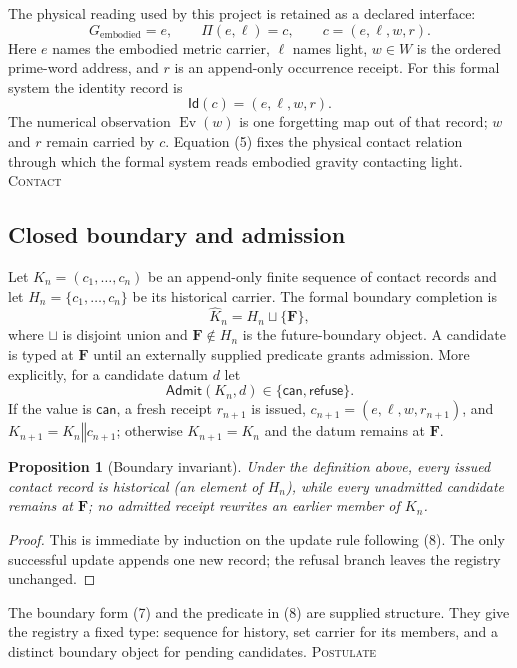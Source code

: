 \documentclass[10pt]{article}
\newtheorem{proposition}[definition]{Proposition}
\theoremstyle{remark}
\newcommand{\Ev}{\operatorname{Ev}}
\newcommand{\Admit}{\mathsf{Admit}}
\newcommand{\Id}{\mathsf{Id}}
\newcommand{\cstatus}[1]{\hfill\textsc{#1}}
\newcommand{\postulate}{\textsc{Postulate}}
\newcommand{\interface}{\textsc{Contact}}
\begin{document}
The physical reading used by this project is retained as a declared interface:
\[
 G_{\mathrm{embodied}}=e,\qquad
 \Pi(e,\ell)=c,\qquad
 c=(e,\ell,w,r).
\tag{5}
\]
Here $e$ names the embodied metric carrier, $\ell$ names light, $w\in W$ is
the ordered prime-word address, and $r$ is an append-only occurrence receipt.
For this formal system the identity record is
\[
 \Id(c)=(e,\ell,w,r).
\tag{6}
\]
The numerical observation $\Ev(w)$ is one forgetting map out of that record;
$w$ and $r$ remain carried by $c$.  Equation (5) fixes the physical contact
relation through which the formal system reads embodied gravity contacting
light. \cstatus{\interface}

\subsection{Closed boundary and admission}

Let $K_n=(c_1,\ldots,c_n)$ be an append-only finite sequence of contact
records and let $H_n=\{c_1,\ldots,c_n\}$ be its historical carrier.  The
formal boundary completion is
\[
 \widehat K_n=H_n\sqcup\{\mathbf F\},
\tag{7}
\]
where $\sqcup$ is disjoint union and $\mathbf F\notin H_n$ is the
future-boundary object.  A candidate is typed at $\mathbf F$ until an
externally supplied predicate grants admission.
More explicitly, for a candidate datum $d$ let
\[
 \Admit(K_n,d)\in\{\mathsf{can},\mathsf{refuse}\}.
\tag{8}
\]
If the value is $\mathsf{can}$, a fresh receipt $r_{n+1}$ is issued,
$c_{n+1}=(e,\ell,w,r_{n+1})$, and
$K_{n+1}=K_n\mathbin{\Vert}c_{n+1}$; otherwise $K_{n+1}=K_n$ and the datum
remains at $\mathbf F$.

\begin{proposition}[Boundary invariant]
Under the definition above, every issued contact record is historical (an
element of $H_n$), while every unadmitted candidate remains at $\mathbf F$;
no admitted receipt rewrites an earlier member of $K_n$.
\end{proposition}

\begin{proof}
This is immediate by induction on the update rule following (8).  The only
successful update appends one new record; the refusal branch leaves the
registry unchanged.
\end{proof}

The boundary form (7) and the predicate in (8) are supplied structure.  They
give the registry a fixed type: sequence for history, set carrier for its
members, and a distinct boundary object for pending candidates.
\cstatus{\postulate}
\end{document}
